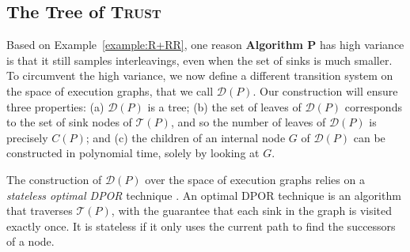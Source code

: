 \documentclass[acmsmall]{acmart}
\newcommand{\trust}{\textsc{Trust}\xspace}
\newcommand{\dpor}{\textsc{DPOR}\xspace}
\begin{document}
\subsection{The Tree of \trust} \label{trust_sec:tree}
Based on Example~\ref{example:R+RR}, one reason \textbf{Algorithm P} has high variance is that it still samples interleavings, even when the set of sinks is much smaller. To circumvent the high variance, we now define a different transition system on the space of execution graphs, that we call
$\mathcal{D}(P)$.
Our construction will ensure three properties:
(a) $\mathcal{D}(P)$ is a tree;
(b) the set of leaves of $\mathcal{D}(P)$ corresponds to the set of sink nodes of $\mathcal{T}(P)$, and so the number of leaves
of $\mathcal{D}(P)$ is precisely $C(P)$; and 
(c) the children of an internal node $G$ of $\mathcal{D}(P)$ can be constructed in polynomial time, solely by looking at $G$.

The construction of \(\mathcal{D}(P)\) over the space of execution graphs relies on a \emph{stateless optimal \dpor} technique \cite{optimal-dpor,trust}.
An optimal \dpor technique is an algorithm that traverses $\mathcal{T}(P)$, with the guarantee that each sink in the graph is visited exactly once.
It is stateless if it only uses the current path to find the successors of a node.

%
\end{document}
